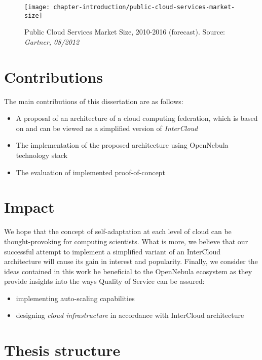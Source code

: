 \begin{figure}[!ht]
  \begin{center}
    \texttt{[image: chapter-introduction/public-cloud-services-market-size]}
  \end{center}
  \caption{Public Cloud Services Market Size, 2010-2016 (forecast). Source: \textit{Gartner, 08/2012}}
  \label{chapter-fig:public-cloud-services-market-size}
\end{figure}

\section{Contributions}
The main contributions of this dissertation are as follows:
\begin{itemize}
  \item A proposal of an architecture of a cloud computing federation, which is based on and can be viewed as a simplified version of \emph{InterCloud}
  \item The implementation of the proposed architecture using OpenNebula technology stack
  \item The evaluation of implemented proof-of-concept
\end{itemize}

\section{Impact}
We hope that the concept of self-adaptation at each level of cloud can be thought-provoking for computing scientists.  What is more, we believe that our successful attempt to implement a simplified variant of an InterCloud architecture will cause its gain in interest and popularity. 
Finally, we consider the ideas contained in this work be beneficial to the OpenNebula ecosystem as they provide insights into the ways Quality of Service can be assured:
\begin{itemize}
  \item implementing auto-scaling capabilities
  \item designing \emph{cloud infrastructure} in accordance with InterCloud architecture
\end{itemize}

\section{Thesis structure}

